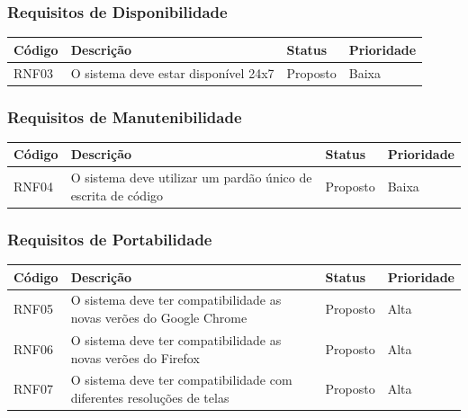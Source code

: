 \documentclass[a4paper, 12pt]{article}
\begin{document}
\subsubsection{Requisitos de Disponibilidade}
\begin{table}[ht]
	\centering

	\begin{tabular}{p{2cm}p{7cm}p{2cm}p{2cm}}
		\hline
		\cellcolor{gray}Código&\cellcolor{gray}Descrição&\cellcolor{gray}Status&\cellcolor{gray}Prioridade  \\
		\hline
		RNF03&O sistema deve estar dispon\'{i}vel 24x7&Proposto&Baixa\\
		\hline
	\end{tabular}
\end{table}
\subsubsection{Requisitos de Manutenibilidade}
\begin{table}[ht]
	\rowcolors{1}{}{}
	\centering

	\begin{tabular}{p{2cm}p{7cm}p{2cm}p{2cm}}
		\hline
		\cellcolor{gray}Código&\cellcolor{gray}Descrição&\cellcolor{gray}Status&\cellcolor{gray}Prioridade  \\
		\hline
		RNF04&O sistema deve utilizar um pard\~{a}o \'{u}nico de escrita de c\'{o}digo&Proposto&Baixa\\
		\hline
	\end{tabular}
\end{table}%
\subsubsection{Requisitos de Portabilidade}
\begin{table}[ht]
	\centering

	\begin{tabular}{p{2cm}p{7cm}p{2cm}p{2cm}}
		\hline
		\cellcolor{gray}Código&\cellcolor{gray}Descrição&\cellcolor{gray}Status&\cellcolor{gray}Prioridade  \\
		\hline
		RNF05&O sistema deve ter compatibilidade as novas ver\~{o}es do Google Chrome&Proposto&Alta\\
        RNF06&O sistema deve ter compatibilidade as novas ver\~{o}es do Firefox&Proposto&Alta\\
        RNF07&O sistema deve ter compatibilidade com diferentes resolu\c{c}\~{o}es de telas&Proposto&Alta\\
		\hline
	\end{tabular}
\end{table}%
\newpage
\end{document}
